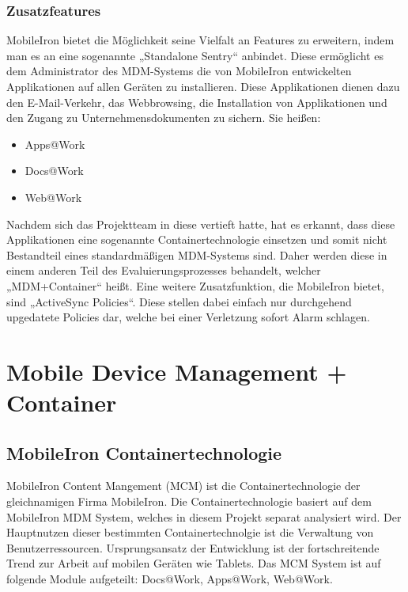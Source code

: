 \subsubsection{Zusatzfeatures}
MobileIron bietet die Möglichkeit seine Vielfalt an Features zu erweitern, indem man es an eine sogenannte „Standalone Sentry“ anbindet. Diese ermöglicht es dem Administrator des MDM-Systems die von MobileIron entwickelten Applikationen auf allen Geräten zu installieren. Diese Applikationen dienen dazu den E-Mail-Verkehr, das Webbrowsing, die Installation von Applikationen und den Zugang zu Unternehmensdokumenten zu sichern. Sie heißen:
\begin{itemize}
	\item Apps@Work
	\item Docs@Work
	\item Web@Work
\end{itemize}
Nachdem sich das Projektteam in diese vertieft hatte, hat es erkannt, dass diese Applikationen eine sogenannte Containertechnologie einsetzen und somit nicht Bestandteil eines standardmäßigen MDM-Systems sind. Daher werden diese in einem anderen Teil des Evaluierungsprozesses behandelt, welcher „MDM+Container“ heißt. Eine weitere Zusatzfunktion, die MobileIron bietet, sind „ActiveSync Policies“. Diese stellen dabei einfach nur durchgehend upgedatete Policies dar, welche bei einer Verletzung sofort Alarm schlagen.

\newpage
\section{Mobile Device Management + Container}
\subsection{MobileIron Containertechnologie}
MobileIron Content Mangement (MCM) ist die Containertechnologie der gleichnamigen Firma MobileIron. Die Containertechnologie basiert auf dem MobileIron MDM System, welches in diesem Projekt separat analysiert wird. \newline
Der Hauptnutzen dieser bestimmten Containertechnolgie ist die Verwaltung von Benutzerressourcen. Ursprungsansatz der Entwicklung ist der fortschreitende Trend zur Arbeit auf mobilen Geräten wie Tablets. Das MCM System ist auf folgende Module aufgeteilt: Docs@Work, Apps@Work, Web@Work.
